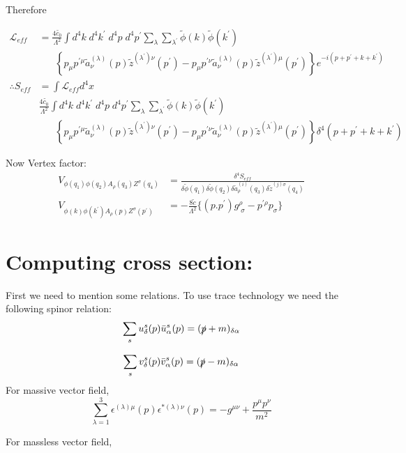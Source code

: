\documentclass[12pt]{report}
\begin{document}
Therefore

\begin{align*}
\mathscr{L}_{eff} &=\frac{4 \tilde{c_0}}{\Lambda^2} \int d^4k \; d^4k^\prime \; d^4p\; d^4 p^\prime \sum_\lambda \sum_{\lambda^\prime} \tilde{\phi}(k) \tilde{\phi}(k^\prime) \\
&\;\;\;\;\;\; \left\{ p_\mu p^{\prime \mu} \tilde{a}^{(\lambda)}_\nu (p) \tilde{z}^{(\lambda^\prime)\nu}(p^\prime)-p_\mu p^{\prime \nu} \tilde{a}^{(\lambda)}_\nu(p) \tilde{z}^{(\lambda^\prime) \mu}(p^\prime) \right\} e^{-i(p+p^\prime+k+k^\prime)}\\
\therefore S_{eff} &= \int \mathscr{L}_{eff} d^4x\\
&\frac{4 \tilde{c_0}}{\Lambda^2} \int d^4k \; d^4k^\prime \; d^4p\; d^4 p^\prime \sum_\lambda \sum_{\lambda^\prime} \tilde{\phi}(k) \tilde{\phi}(k^\prime) \\
&\;\;\;\;\;\; \left\{ p_\mu p^{\prime \mu} \tilde{a}^{(\lambda)}_\nu (p) \tilde{z}^{(\lambda^\prime)\nu}(p^\prime)-p_\mu p^{\prime \nu} \tilde{a}^{(\lambda)}_\nu(p) \tilde{z}^{(\lambda^\prime) \mu}(p^\prime) \right\} \delta^4(p+p^\prime+k+k^\prime)
\end{align*}


Now Vertex factor:
\begin{align}
V_{\phi(q_1) \phi(q_2) A_\rho(q_3) Z^\sigma(q_4)} &=\frac{\delta^4 S_{eff}}{\delta \tilde{\phi}(q_1) \delta \tilde{\phi}(q_2) \delta\tilde{a}^{(i)}_\rho(q_3) \delta \tilde{z}^{(j)\sigma}(q_4)}\\
V_{\phi(k) \phi(k^\prime) A_\rho(p) Z^\sigma(p^\prime)} &= -\frac{8\tilde{c}}{\Lambda^2} \{ (p.p^\prime) g^\rho_{\; \sigma} - p^{\prime \rho} p_\sigma \} \label{gzv}
\end{align}





\section{Computing cross section:} First we need to mention some relations. To use trace technology we need the following spinor relation: $$\sum_s u_\delta^s (p) \bar{u}^s_\alpha (p)=(\slashed{p} + m )_{\delta \alpha}$$

$$\sum_s v_\delta^s (p) \bar{v}^s_\alpha (p)=(\slashed{p} - m )_{\delta \alpha}$$
For massive vector field,
$$\sum_{\lambda=1}^3 \epsilon^{(\lambda) \mu}(p) \epsilon^{*(\lambda) \nu}(p) = - g^{\mu \nu}+ \frac{p^\mu p^\nu}{m^2} $$ 

For massless vector field,
\end{document}
